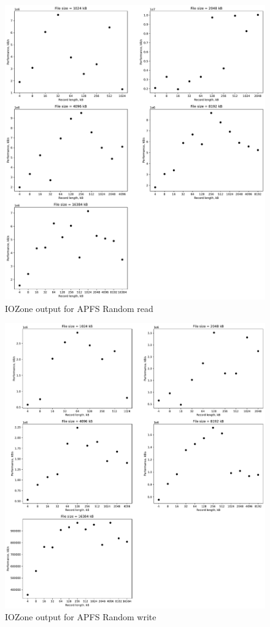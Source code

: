 \begin{figure}[!htb]
	\label{fig:app_bench_apfs_rnd_read}
	\begin{center}
		\includegraphics[width=1.0\textwidth]{figures/benchmarking/local/Random read.pdf}
	\end{center}
	\caption{IOZone output for \gls{APFS} Random read}
\end{figure}

\begin{figure}[!htb]
	\label{fig:app_bench_fapfsrnd_write}
	\begin{center}
		\includegraphics[width=1.0\textwidth]{figures/benchmarking/local/Random write.pdf}
	\end{center}
	\caption{IOZone output for \gls{APFS} Random write}
\end{figure}